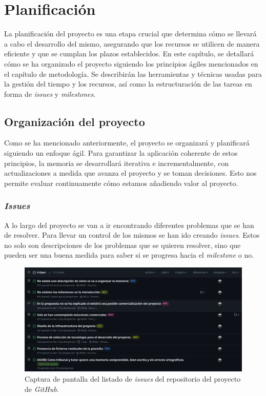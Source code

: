 \chapter{Planificación}

La planificación del proyecto es una etapa crucial que determina cómo se llevará a cabo el desarrollo del mismo, asegurando que los recursos se utilicen de manera eficiente y que se cumplan los plazos establecidos. En este capítulo, se detallará cómo se ha organizado el proyecto siguiendo los principios ágiles mencionados en el capítulo de metodología. Se describirán las herramientas y técnicas usadas para la gestión del tiempo y los recursos, así como la estructuración de las tareas en forma de \textit{issues} y \textit{milestones}.

\section{Organización del proyecto}

Como se ha mencionado anteriormente, el proyecto se organizará y planificará siguiendo un enfoque ágil. Para garantizar la aplicación coherente de estos principios, la memoria se desarrollará iterativa e incrementalmente, con actualizaciones a medida que avanza el proyecto y se toman decisiones. Esto nos permite evaluar continuamente cómo estamos añadiendo valor al proyecto.

\subsection{\textit{Issues}}

A lo largo del proyecto se van a ir encontrando diferentes problemas que se han de resolver. Para llevar un control de los mismos se han ido creando \textit{issues}. Estos no solo son descripciones de los problemas que se quieren resolver, sino que pueden ser una buena medida para saber si se progresa hacia el \textit{milestone} o no.

\begin{figure}[H]
    \caption{Captura de pantalla del listado de \textit{issues} del repositorio del proyecto de \textit{GitHub}.}
    \centering
    \vspace*{0.5cm}
    \includegraphics[scale=0.2]{figuras/github_issues.png}
\end{figure}

